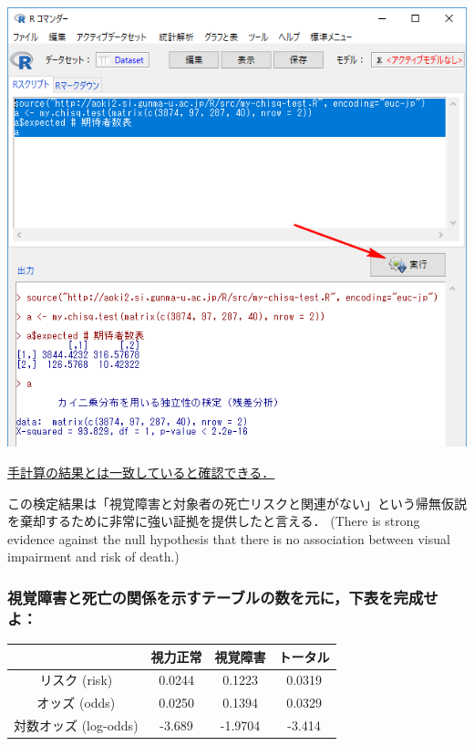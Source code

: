 \documentclass[11pt,]{problemset}
\begin{document}
\begin{center}\includegraphics[width=0.8\linewidth]{pic/mychisqtest01} \end{center}

\underline{手計算の結果とは一致していると確認できる．}

この検定結果は「視覚障害と対象者の死亡リスクと関連がない」という帰無仮説を棄却するために非常に強い証拠を提供したと言える．
(There is strong evidence against the null hypothesis that there is no
association between visual impairment and risk of death.)

\newpage
\vfill

\subsubsection{視覚障害と死亡の関係を示すテーブルの数を元に，下表を完成せよ：}

\begin{center}
\begin{tabular}{|c|c|c|c|}
\hline
                 & 視力正常   & 視覚障害    & トータル   \\ \hline
リスク (risk)       & 0.0244 & 0.1223  & 0.0319 \\ \hline
オッズ (odds)       & 0.0250 & 0.1394  & 0.0329 \\ \hline
対数オッズ (log-odds) & -3.689 & -1.9704 & -3.414 \\ \hline
\end{tabular}
\end{center}

\bigskip
\end{document}
